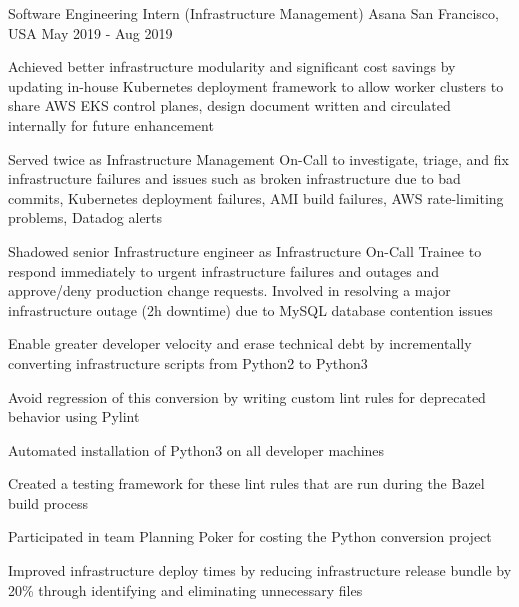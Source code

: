 

\begin{cventries}


  \cventry
  {Software Engineering Intern (Infrastructure Management)} %
    {Asana} %
    {San Francisco, USA} %
    {May 2019 - Aug 2019} %
    {
      \begin{cvitems} %
      \item {Achieved better infrastructure modularity and significant cost savings by updating in-house Kubernetes deployment framework to allow worker clusters to share AWS EKS control planes, design document written and circulated internally for future enhancement}
      \item {Served twice as Infrastructure Management On-Call to investigate, triage, and fix infrastructure failures and issues such as broken infrastructure due to bad commits, Kubernetes deployment failures, AMI build failures, AWS rate-limiting problems, Datadog alerts}
      \item {Shadowed senior Infrastructure engineer as Infrastructure On-Call Trainee to respond immediately to urgent infrastructure failures and outages and approve/deny production change requests. Involved in resolving a major infrastructure outage (2h downtime) due to MySQL database contention issues}
      \item {Enable greater developer velocity and erase technical debt by incrementally converting infrastructure scripts from Python2 to Python3}
      \item {Avoid regression of this conversion by writing custom lint rules for deprecated behavior using Pylint}
      \item {Automated installation of Python3 on all developer machines}
      \item {Created a testing framework for these lint rules that are run during the Bazel build process}
      \item {Participated in team Planning Poker for costing the Python conversion project}
      \item {Improved infrastructure deploy times by reducing infrastructure release bundle by 20\% through identifying and eliminating unnecessary files}
      \end{cvitems}
    }


\end{cventries}
